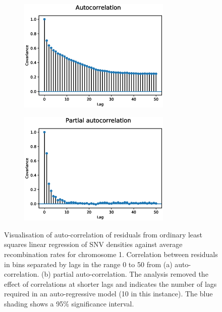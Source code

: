 \documentclass[12pt]{article}%
\begin{document}
\begin{figure}[h!]
\begin{subfigure} {1.0\textwidth}
\center
\includegraphics[width=0.8\textwidth]{figs/correlation_plot_supp_b.eps}
\caption{}
\label{fig:autocorrelation-a}
\end{subfigure}
\begin{subfigure} {1.0\textwidth}
\center
\includegraphics[width=0.8\textwidth]{figs/correlation_plot_supp_c.eps}
\caption{}
\label{fig:autocorrelation-b}
\end{subfigure}
\caption{Visualisation of auto-correlation of residuals from ordinary least squares linear regression of SNV densities against average recombination rates for chromosome 1. Correlation between residuals in bins separated by lags in the range 0 to 50 from (a) auto-correlation. (b) partial auto-correlation. The analysis removed the effect of correlations at shorter lags and indicates the number of lags required in an auto-regressive model (10 in this instance). The blue shading shows a 95\% significance interval.}
\label{fig:autocorrelation}
\end{figure}
\end{document}
